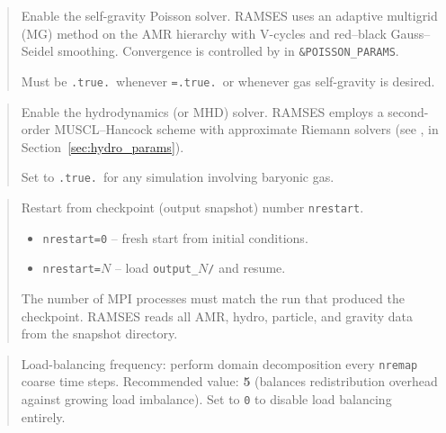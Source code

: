 \begin{quote}
Enable the self-gravity Poisson solver.  RAMSES uses an adaptive
multigrid (MG) method on the AMR hierarchy with V-cycles and
red--black Gauss--Seidel smoothing.  Convergence is controlled by
 in \texttt{\&POISSON\_PARAMS}.

Must be \texttt{.true.}\ whenever \texttt{=.true.}\ or
whenever gas self-gravity is desired.
\end{quote}

\label{param:hydro}

\begin{quote}
Enable the hydrodynamics (or MHD) solver.  RAMSES employs a
second-order MUSCL--Hancock scheme with approximate Riemann solvers
(see ,  in
Section~\ref{sec:hydro_params}).

Set to \texttt{.true.}\ for any simulation involving baryonic gas.
\end{quote}

\label{param:nrestart}

\begin{quote}
Restart from checkpoint (output snapshot) number \texttt{nrestart}.
\begin{itemize}[nosep]
  \item \texttt{nrestart=0} -- fresh start from initial conditions.
  \item \texttt{nrestart=}$N$ -- load \texttt{output\_}$N$\texttt{/} and resume.
\end{itemize}
The number of MPI processes must match the run that produced the
checkpoint.  RAMSES reads all AMR, hydro, particle, and gravity data
from the snapshot directory.
\end{quote}

\label{param:nremap}

\begin{quote}
Load-balancing frequency: perform domain decomposition every
\texttt{nremap} coarse time steps.  Recommended value: \textbf{5}
(balances redistribution overhead against growing load imbalance).
Set to \texttt{0} to disable load balancing entirely.

\end{quote}

